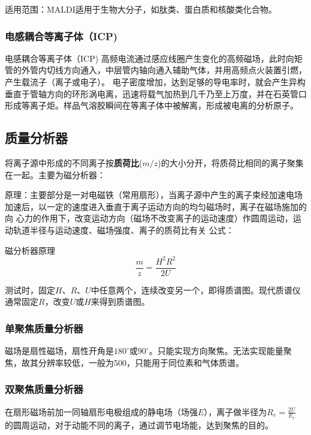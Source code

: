     适用范围：MALDI适用于生物大分子，如肽类、蛋白质和核酸类化合物。

\subsubsection*{电感耦合等离子体（ICP)}
    \begin{definition*}{电感耦合等离子体（ICP)}
        高频电流通过感应线圈产生变化的高频磁场，此时向矩管的外管内切线方向通入，中层管内轴向通入辅助气体，并用高频点火装置引燃，产生载流子（离子或电子）。 电子密度增加，达到足够的导电率时，就会产生异构垂直于管轴方向的环形涡电离，迅速将载气加热到几千乃至上万度，并在石英管口形成等离子炬。样品气溶胶瞬间在等离子体中被解离，形成被电离的分析原子。
    \end{definition*}


\subsection{质量分析器}
将离子源中形成的不同离子按\textbf{质荷比}($m/z$)的大小分开，将质荷比相同的离子聚集在一起。主要为磁分析器：

原理：主要部分是一对电磁铁（常用扇形），当离子源中产生的离子束经加速电场加速后，以一定的速度进入垂直于离子运动方向的均匀磁场时，离子在磁场施加的向
心力的作用下，改变运动方向（磁场不改变离子的运动速度）作圆周运动，运动轨道半径与运动速度、磁场强度、离子的质荷比有关
公式：
\begin{theorem*}{磁分析器原理}
    \begin{equation*}
        \frac{m}{z}=\frac{H^{2}R^{2}}{2U}
    \end{equation*}
\end{theorem*}

测试时，固定$H$、$R$、$U$中任意两个，连续改变另一个，即得质谱图。现代质谱仪通常固定$R$，改变$U$或$H$来得到质谱图。
\subsubsection*{单聚焦质量分析器}
磁场是扇性磁场，扇性开角是$180^{\circ}$或$90^{\circ}$。只能实现方向聚焦。无法实现能量聚焦，故其分辨率较低，一般为500，只能用于同位素和气体质谱。
\subsubsection*{双聚焦质量分析器}
在扇形磁场前加一同轴扇形电极组成的静电场（场强$E$），离子做半径为$R_{e}=\frac{2U}{E_{e}}$
的圆周运动，对于动能不同的离子，通过调节电场能，达到聚焦的目的。

